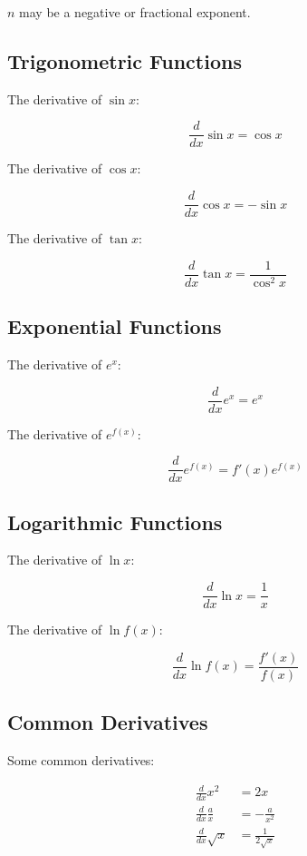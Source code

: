 \documentclass[a4paper,11pt]{article}
\begin{document}
$n$ may be a negative or fractional exponent.


\subsection{Trigonometric Functions}

The derivative of $\sin{x}$:

$$
\frac{d}{dx} \sin{x} = \cos{x}
$$

The derivative of $\cos{x}$:

$$
\frac{d}{dx} \cos{x} = -\sin{x}
$$

The derivative of $\tan{x}$:

$$
\frac{d}{dx} \tan{x} = \frac{1}{\cos^2{x}}
$$



\subsection{Exponential Functions}

The derivative of $e^x$:

$$
\frac{d}{dx} e^x = e^x
$$

The derivative of $e^{f(x)}$:

$$
\frac{d}{dx} e^{f(x)} = f'(x)e^{f(x)}
$$


\subsection{Logarithmic Functions}

The derivative of $\ln{x}$:

$$
\frac{d}{dx} \ln{x} = \frac{1}{x}
$$

The derivative of $\ln{f(x)}$:

$$
\frac{d}{dx} \ln{f(x)} = \frac{f'(x)}{f(x)}
$$


\subsection{Common Derivatives}

Some common derivatives:

$$
\begin{aligned}
\frac{d}{dx} x^2 & = 2x \\
\frac{d}{dx} \frac{a}{x} & = -\frac{a}{x^2} \\
\frac{d}{dx} \sqrt{x} & = \frac{1}{2\sqrt{x}} \\
\end{aligned}
$$
\end{document}
